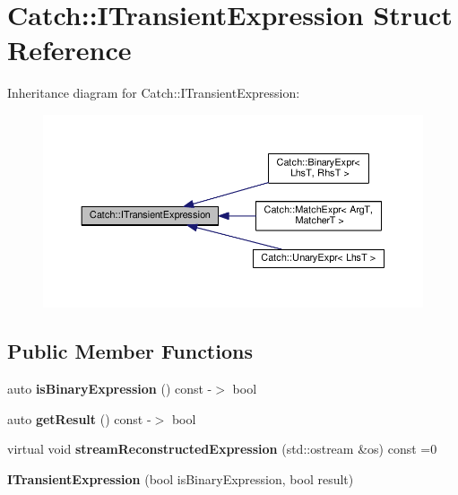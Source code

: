 \hypertarget{structCatch_1_1ITransientExpression}{}\section{Catch\+:\+:I\+Transient\+Expression Struct Reference}
\label{structCatch_1_1ITransientExpression}


Inheritance diagram for Catch\+:\+:I\+Transient\+Expression\+:
\nopagebreak
\begin{figure}[H]
\begin{center}
\leavevmode
\includegraphics[width=350pt]{structCatch_1_1ITransientExpression__inherit__graph}
\end{center}
\end{figure}
\subsection*{Public Member Functions}
\begin{DoxyCompactItemize}
\item 
auto {\bfseries is\+Binary\+Expression} () const -\/$>$ bool\hypertarget{structCatch_1_1ITransientExpression_a3b436e13a0a6d3522bbf70d4e31deb22}{}\label{structCatch_1_1ITransientExpression_a3b436e13a0a6d3522bbf70d4e31deb22}

\item 
auto {\bfseries get\+Result} () const -\/$>$ bool\hypertarget{structCatch_1_1ITransientExpression_a101c7db86c87eff93a8ff496720e6320}{}\label{structCatch_1_1ITransientExpression_a101c7db86c87eff93a8ff496720e6320}

\item 
virtual void {\bfseries stream\+Reconstructed\+Expression} (std\+::ostream \&os) const =0\hypertarget{structCatch_1_1ITransientExpression_aabe1889df9c6e639a24afb08d8a0fe9e}{}\label{structCatch_1_1ITransientExpression_aabe1889df9c6e639a24afb08d8a0fe9e}

\item 
{\bfseries I\+Transient\+Expression} (bool is\+Binary\+Expression, bool result)\hypertarget{structCatch_1_1ITransientExpression_aafe69572b7ed884e63ec81f58d4afd8c}{}\label{structCatch_1_1ITransientExpression_aafe69572b7ed884e63ec81f58d4afd8c}

\end{DoxyCompactItemize}
